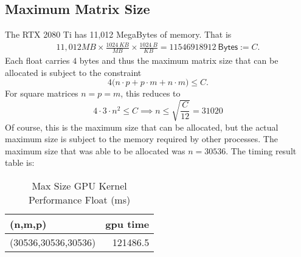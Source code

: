 \documentclass{article}
\begin{document}
\subsection{Maximum Matrix Size}
The RTX 2080 Ti has 11,012 MegaBytes of memory. That is 
\begin{align*}
    11,012 MB \times \frac{1024\ KB}{MB} \times \frac{1024\ B}{KB} = 11546918912\ \mathsf{Bytes} := C.
\end{align*}
Each float carries $4$ bytes and thus the maximum matrix size that can be allocated is subject to the constraint
$$4\big(n \cdot p + p \cdot m + n \cdot m\big) \leq C.$$
For square matrices $n = p = m$, this reduces to 
$$4 \cdot 3 \cdot n^2 \leq C \implies n \leq \sqrt{\frac{C}{12}} = 31020$$
Of course, this is the maximum size that can be allocated, but the actual maximum size is subject to the memory
required by other processes. The maximum size that was able to be allocated was $n = 30536$. 
The timing result table is:
\begin{table}[H]
    \centering
    \caption{Max Size GPU Kernel Performance Float (ms)}
    \fontsize{12}{14}\selectfont
    \begin{tabular}[t]{lr}
    \toprule
    (n,m,p) & gpu time\\
    \midrule
    (30536,30536,30536) & 121486.5\\
    \bottomrule
    \end{tabular}
\end{table}
\end{document}
